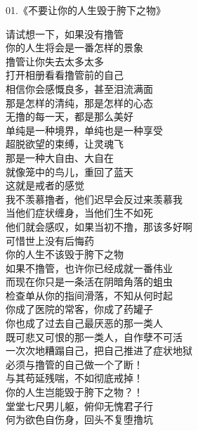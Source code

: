 \documentclass{ctexart}
\begin{document}
\begin{center}
    01.《不要让你的人生毁于胯下之物》\it
    \begin{multicols}{2}
        请试想一下，如果没有撸管 \\ 你的人生将会是一番怎样的景象 \\ 撸管让你失去太多太多 \\ 打开相册看看撸管前的自己 \\ 相信你会感慨良多，甚至泪流满面 \\ 那是怎样的清纯，那是怎样的心态 \\ 无撸的每一天，都是那么美好 \\ 单纯是一种境界，单纯也是一种享受 \\ 超脱欲望的束缚，让灵魂飞 \\ 那是一种大自由、大自在 \\ 就像笼中的鸟儿，重回了蓝天 \\ 这就是戒者的感觉 \\ 我不羡慕撸者，他们迟早会反过来羡慕我 \\ 当他们症状缠身，当他们生不如死 \\ 他们就会感叹，如果当初不撸，那该多好啊 \\ 可惜世上没有后悔药 \\ 你的人生不该毁于胯下之物 \\ 如果不撸管，也许你已经成就一番伟业 \\ 而现在你只是一条活在阴暗角落的蛆虫 \\ 检查单从你的指间滑落，不知从何时起 \\ 你成了医院的常客，你成了药罐子 \\ 你也成了过去自己最厌恶的那一类人 \\ 既可悲又可恨的那一类人，自作孽不可活 \\ 一次次地糟蹋自己，把自己推进了症状地狱 \\ 必须与撸管的自己做一个了断！ \\ 与其苟延残喘，不如彻底戒掉！ \\ 你的人生岂能毁于胯下之物？！ \\ 堂堂七尺男儿躯，俯仰无愧君子行 \\ 何为欲色自伤身，回头不复堕撸坑
    \end{multicols}
\end{center}
\end{document}

